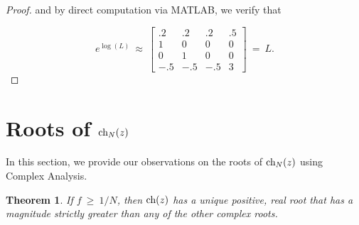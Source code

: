 \documentclass[11pt,reqno]{amsart}
\numberwithin{equation}{section}
\theoremstyle{plain}
\newtheorem{theorem}[thm]{Theorem}
\newcommand{\ch}{\textnormal{ch}}
\begin{document}
\begin{proof}
and by direct computation via MATLAB, we verify that

\begin{equation}
    e^{\log(L)} \ \approx \  \begin{bmatrix}
        .2 & .2 & .2 & .5\\ 
        1 & 0 & 0 & 0\\
        0 & 1 & 0 & 0 \\ 
        -.5 & -.5 & -.5 & 3
    \end{bmatrix} \ = \ L.
\end{equation}

\end{proof}


 \appendix

\section{Roots of $\ch_N(z)$} \label{app:A}

In this section, we provide our observations on the roots of $\ch_N(z)$ using Complex Analysis. 

\begin{theorem}
    If $f \ \geq \ 1/N$, then $\ch(z)$ has a unique positive, real 
    root that has a magnitude strictly greater than any of the other 
    complex roots. 
\end{theorem}
\end{document}
